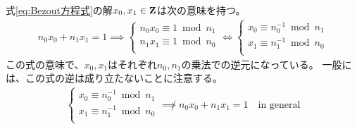	式\eqref{eq:Bezout方程式}の解$x_0,x_1\in\mathbf{Z}$は次の意味を持つ。
	\begin{equation}\label{eq:Bezout方程式の解は逆元}\begin{split}
		n_0x_0 + n_1x_1 = 1 \implies \begin{cases}
			n_0x_0 \equiv 1 \bmod n_1 \\
			n_1x_1 \equiv 1 \bmod n_0 \\
		\end{cases} \iff \begin{cases}
			x_0 \equiv n_0^{-1} \bmod n_1 \\
			x_1 \equiv n_1^{-1} \bmod n_0 \\
		\end{cases}
	\end{split}\end{equation}
	この式の意味で、$x_0,x_1$はそれぞれ$n_0,n_1$の乗法での逆元になっている。
	一般には、この式の逆は成り立たないことに注意する。
	\begin{equation*}\begin{split}
		\begin{cases}
			x_0 \equiv n_0^{-1} \bmod n_1 \\
			x_1 \equiv n_1^{-1} \bmod n_0 \\
		\end{cases} \not\implies n_0x_0 + n_1x_1 = 1
		\quad\text{in general}
	\end{split}\end{equation*}

